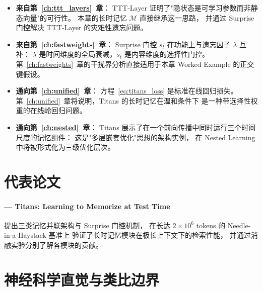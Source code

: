 \begin{itemize}
  \item \textbf{来自第~\ref{ch:ttt_layers}~章}：
    TTT-Layer 证明了"隐状态是可学习参数而非静态向量"的可行性。
    本章的长时记忆 $\mathcal{M}$ 直接继承这一思路，
    并通过 Surprise 门控解决 TTT-Layer 的灾难性遗忘问题。

  \item \textbf{来自第~\ref{ch:fastweights}~章}：
    Surprise 门控 $s_t$ 在功能上与遗忘因子 $\lambda$ 互补：
    $\lambda$ 是时间维度的全局衰减，$s_t$ 是内容维度的选择性门控。
    第~\ref{ch:fastweights}~章的干扰界分析直接适用于本章 Worked Example 的正交键假设。

  \item \textbf{通向第~\ref{ch:unified}~章}：
    方程~\eqref{eq:titans_loss} 是标准在线回归损失。
    第~\ref{ch:unified}~章将说明，Titans 的长时记忆在温和条件下
    是一种带选择性权重的在线岭回归问题。

  \item \textbf{通向第~\ref{ch:nested}~章}：
    Titans 展示了在一个前向传播中同时运行三个时间尺度的记忆组件：
    这是"多层嵌套优化"思想的架构实例，
    在 Nested Learning 中将被形式化为三级优化层次。
\end{itemize}

\section{代表论文}
\label{sec:titans_papers}

\paragraph{\citet{behrouz2024titans} — Titans: Learning to Memorize at Test Time}
提出三类记忆并联架构与 Surprise 门控机制，
在长达 $2 \times 10^6$ tokens 的 Needle-in-a-Haystack 基准上
验证了长时记忆模块在极长上下文下的检索性能，
并通过消融实验分别了解各模块的贡献。

\section{神经科学直觉与类比边界}
\label{sec:titans_neuro}

